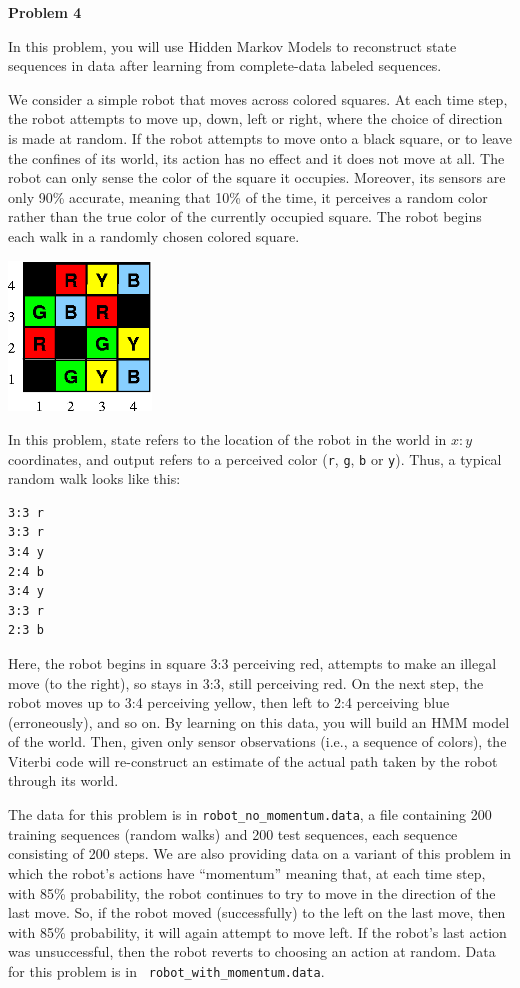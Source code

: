 \documentclass[submit]{harvardml}
\begin{document}
{\bf Problem 4}
\medskip

In this problem, you will use Hidden Markov Models to reconstruct
state sequences in data after learning from complete-data labeled
sequences.

We consider a simple robot that moves across colored squares. At each
time step, the robot attempts to move up, down, left or right, where
the choice of direction is made at random.  If the robot attempts to
move onto a black square, or to leave the confines of its world, its
action has no effect and it does not move at all.  The robot can only
sense the color of the square it occupies.  Moreover, its sensors are
only 90\% accurate, meaning that 10\% of the time, it perceives a
random color rather than the true color of the currently occupied
square.  The robot begins each walk in a randomly chosen colored
square.


\begin{center}
  \includegraphics[width=1.5in]{robot_maze.png}
\end{center}

In this problem, state refers to the location of the robot in the
world in $x:y$ coordinates, and output refers to a perceived color
({\tt r}, {\tt g}, {\tt b} or {\tt y}). Thus, a typical random walk
looks like this:



\begin{verbatim}
3:3 r
3:3 r
3:4 y
2:4 b
3:4 y
3:3 r
2:3 b
\end{verbatim}

Here, the robot begins in square 3:3 perceiving red, attempts to make
an illegal move (to the right), so stays in 3:3, still perceiving red.
On the next step, the robot moves up to 3:4 perceiving yellow, then
left to 2:4 perceiving blue (erroneously), and so on. By learning
on this data, you will build an HMM model of the world.
Then, given only sensor observations (i.e., a sequence of colors), the
Viterbi code will re-construct an estimate of the actual path taken by
the robot through its world.

The data for this problem is in {\tt robot\_no\_momentum.data}, a file
containing 200 training sequences (random walks) and 200 test
sequences, each sequence consisting of 200 steps. We are also
providing data on a variant of this problem in which the robot's
actions have ``momentum'' meaning that, at each time step, with 85\%
probability, the robot continues to try to move in the direction of the last
move.  So, if the robot moved (successfully) to the left on the last
move, then with 85\% probability, it will again attempt to move left.
If the robot's last action was unsuccessful, then the robot reverts to
choosing an action at random.  Data for this problem is in {\tt
  robot\_with\_momentum.data}.
\end{document}
